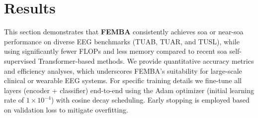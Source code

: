 \section{Results}\label{sec:results}
This section demonstrates that \textbf{FEMBA} consistently achieves \gls{soa} or near-\gls{soa} performance on diverse EEG benchmarks (TUAB, TUAR, and TUSL), while using significantly fewer FLOPs and less memory compared to recent \gls{soa} self-supervised Transformer-based methods. We provide quantitative accuracy metrics and efficiency analyses, which underscores FEMBA’s suitability for large-scale clinical or wearable EEG systems. For specific training details we fine-tune all layers (encoder + classifier) end-to-end using the Adam optimizer (initial learning rate of $1 \times 10^{-4}$) with cosine decay scheduling. Early stopping is employed based on validation loss to mitigate overfitting.

